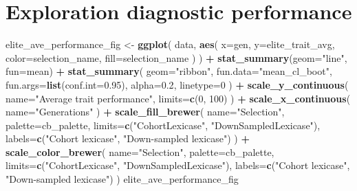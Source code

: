 \documentclass[]{book}
\newenvironment{Shaded}{\begin{snugshade}}{\end{snugshade}}
\newcommand{\DataTypeTok}[1]{\textcolor[rgb]{0.13,0.29,0.53}{#1}}
\newcommand{\DecValTok}[1]{\textcolor[rgb]{0.00,0.00,0.81}{#1}}
\newcommand{\FloatTok}[1]{\textcolor[rgb]{0.00,0.00,0.81}{#1}}
\newcommand{\KeywordTok}[1]{\textcolor[rgb]{0.13,0.29,0.53}{\textbf{#1}}}
\newcommand{\NormalTok}[1]{#1}
\newcommand{\OperatorTok}[1]{\textcolor[rgb]{0.81,0.36,0.00}{\textbf{#1}}}
\newcommand{\StringTok}[1]{\textcolor[rgb]{0.31,0.60,0.02}{#1}}
\begin{document}
\hypertarget{exploration-diagnostic-performance-6}{%
\section{Exploration diagnostic performance}\label{exploration-diagnostic-performance-6}}

\begin{Shaded}
\begin{Highlighting}[]
\NormalTok{elite_ave_performance_fig <-}
\StringTok{  }\KeywordTok{ggplot}\NormalTok{(}
\NormalTok{    data,}
    \KeywordTok{aes}\NormalTok{(}
      \DataTypeTok{x=}\NormalTok{gen,}
      \DataTypeTok{y=}\NormalTok{elite_trait_avg,}
      \DataTypeTok{color=}\NormalTok{selection_name,}
      \DataTypeTok{fill=}\NormalTok{selection_name}
\NormalTok{    )}
\NormalTok{  ) }\OperatorTok{+}
\StringTok{  }\KeywordTok{stat_summary}\NormalTok{(}\DataTypeTok{geom=}\StringTok{"line"}\NormalTok{, }\DataTypeTok{fun=}\NormalTok{mean) }\OperatorTok{+}
\StringTok{  }\KeywordTok{stat_summary}\NormalTok{(}
    \DataTypeTok{geom=}\StringTok{"ribbon"}\NormalTok{,}
    \DataTypeTok{fun.data=}\StringTok{"mean_cl_boot"}\NormalTok{,}
    \DataTypeTok{fun.args=}\KeywordTok{list}\NormalTok{(}\DataTypeTok{conf.int=}\FloatTok{0.95}\NormalTok{),}
    \DataTypeTok{alpha=}\FloatTok{0.2}\NormalTok{,}
    \DataTypeTok{linetype=}\DecValTok{0}
\NormalTok{  ) }\OperatorTok{+}
\StringTok{  }\KeywordTok{scale_y_continuous}\NormalTok{(}
    \DataTypeTok{name=}\StringTok{"Average trait performance"}\NormalTok{,}
    \DataTypeTok{limits=}\KeywordTok{c}\NormalTok{(}\DecValTok{0}\NormalTok{, }\DecValTok{100}\NormalTok{)}
\NormalTok{  ) }\OperatorTok{+}
\StringTok{  }\KeywordTok{scale_x_continuous}\NormalTok{(}
    \DataTypeTok{name=}\StringTok{"Generations"}
\NormalTok{  ) }\OperatorTok{+}
\StringTok{  }\KeywordTok{scale_fill_brewer}\NormalTok{(}
    \DataTypeTok{name=}\StringTok{"Selection"}\NormalTok{,}
    \DataTypeTok{palette=}\NormalTok{cb_palette,}
    \DataTypeTok{limits=}\KeywordTok{c}\NormalTok{(}\StringTok{"CohortLexicase"}\NormalTok{, }\StringTok{"DownSampledLexicase"}\NormalTok{),}
    \DataTypeTok{labels=}\KeywordTok{c}\NormalTok{(}\StringTok{"Cohort lexicase"}\NormalTok{, }\StringTok{"Down-sampled lexicase"}\NormalTok{)}
\NormalTok{  ) }\OperatorTok{+}
\StringTok{  }\KeywordTok{scale_color_brewer}\NormalTok{(}
    \DataTypeTok{name=}\StringTok{"Selection"}\NormalTok{,}
    \DataTypeTok{palette=}\NormalTok{cb_palette,}
    \DataTypeTok{limits=}\KeywordTok{c}\NormalTok{(}\StringTok{"CohortLexicase"}\NormalTok{, }\StringTok{"DownSampledLexicase"}\NormalTok{),}
    \DataTypeTok{labels=}\KeywordTok{c}\NormalTok{(}\StringTok{"Cohort lexicase"}\NormalTok{, }\StringTok{"Down-sampled lexicase"}\NormalTok{)}
\NormalTok{  )}
\NormalTok{elite_ave_performance_fig}
\end{Highlighting}
\end{Shaded}
\end{document}
